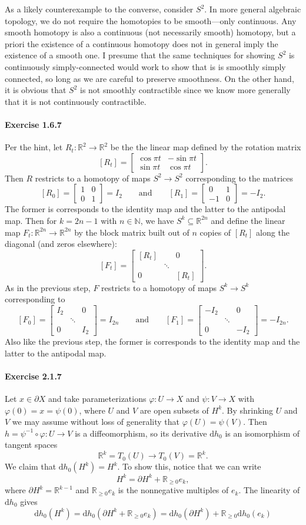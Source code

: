 \documentclass[12pt]{article}
\newcommand{\pnum}[1]{\paragraph{#1}}
\theoremstyle{definition}
\newcommand{\isp}[1]{\qquad\text{#1}\qquad}
\newcommand{\N}{\mathbb{N}}
\newcommand{\R}{\mathbb{R}}
\renewcommand{\phi}{\varphi}
\newcommand{\<}{\langle}
\renewcommand{\>}{\rangle}
\newcommand{\seq}{\subseteq}
\newcommand{\dd}{\mathrm{d}}
\newcommand{\mat}[1]{\begin{bmatrix}#1\end{bmatrix}}
\newcommand{\bd}{\partial}
\begin{document}
As a likely counterexample to the converse, consider $S^2$.
In more general algebraic topology, we do not require the homotopies to be smooth---only continuous.
Any smooth homotopy is also a continuous (not necessarily smooth) homotopy, but a priori the existence of a continuous homotopy does not in general imply the existence of a smooth one.
I presume that the same techniques for showing $S^2$ is continuously simply-connected would work to show that is is smoothly simply connected, so long as we are careful to preserve smoothness.
On the other hand, it is obvious that $S^2$ is not smoothly contractible since we know more generally that it is not continuously contractible.


\pnum{Exercise 1.6.7}

Per the hint, let $R_t : \R^2 \to \R^2$ be the the linear map defined by the rotation matrix
\[
    [R_t] = \mat{\cos\pi t & - \sin{\pi t} \\ \sin{\pi t} & \cos{\pi t}}.
\]
Then $R$ restricts to a homotopy of maps $S^2 \to S^2$ corresponding to the matrices
\[
    [R_0] = \mat{1 & 0 \\ 0 & 1} = I_2
    \isp{and}
    [R_1] = \mat{0 & 1 \\ -1 & 0} = -I_2.
\]
The former is corresponds to the identity map and the latter to the antipodal map.
Then for $k = 2n - 1$ with $n \in \N$, we have $S^k \seq \R^{2n}$ and define the linear map $F_t : \R^{2n} \to \R^{2n}$ by the block matrix built out of $n$ copies of $[R_t]$ along the diagonal (and zeros elsewhere):
\[
    [F_t] = \mat{[R_t] && 0 \\ & \ddots \\ 0 && [R_t]}.
\]
As in the previous step, $F$ restricts to a homotopy of maps $S^k \to S^k$ corresponding to 
\[
    [F_0] = \mat{I_2 && 0 \\ & \ddots \\ 0 && I_2} = I_{2n}
    \isp{and}
    [F_1] = \mat{-I_2 && 0 \\ & \ddots \\ 0 && -I_2} = -I_{2n}.
\]
Also like the previous step, the former is corresponds to the identity map and the latter to the antipodal map.




\pnum{Exercise 2.1.7}

Let $x \in \bd X$ and take parameterizations $\phi : U \to X$ and $\psi : V \to X$ with $\phi(0) = x = \psi(0)$, where $U$ and $V$ are open subsets of $H^k$.
By shrinking $U$ and $V$ we may assume without loss of generality that $\phi(U) = \psi(V)$.
Then $h = \psi^{-1} \circ \phi : U \to V$ is a diffeomorphism, so its derivative $\dd{h}_0$ is an isomorphism of tangent spaces
\[
    \R^k = T_0(U) \longrightarrow T_0(V) = \R^k.
\]
We claim that $\dd{h}_0(H^k) = H^k$.
To show this, notice that we can write
\[
    H^k = \bd H^k + \R_{\geq 0}e_k,
\]
where $\bd H^k = \R^{k-1}$ and $\R_{\geq 0}e_k$ is the nonnegative multiples of $e_k$.
The linearity of $\dd{h}_0$ gives
\[
    \dd{h}_0(H^k)
        = \dd{h}_0(\bd H^k + \R_{\geq 0}e_k)
        = \dd{h}_0(\bd H^k) + \R_{\geq 0}\dd{h}_0(e_k)
\]
\end{document}
